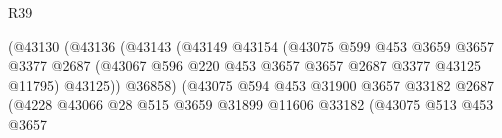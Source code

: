 \begin{lexlean}{R39}
\begin{coremodule}
                                              (@43130
                                                (@43136
                                                  (@43143
                                                    (@43149
                                                      @43154
                                                      (@43075
                                                        @599
                                                        @453
                                                        @3659
                                                        @3657
                                                        @3377
                                                        @2687
                                                        (@43067
                                                          @596
                                                          @220
                                                          @453
                                                          @3657
                                                          @3657
                                                          @2687
                                                          @3377
                                                          @43125
                                                          @11795)
                                                        @43125))
                                                    @36858)
                                                  (@43075
                                                    @594
                                                    @453
                                                    @31900
                                                    @3657
                                                    @33182
                                                    @2687
                                                    (@4228
                                                      @43066
                                                      @28
                                                      @515
                                                      @3659
                                                      @31899
                                                      @11606
                                                      @33182
                                                      (@43075
                                                        @513
                                                        @453
                                                        @3657

\end{coremodule}
\end{lexlean}
